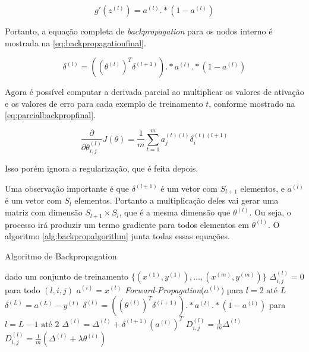 \begin{equation}\label{eq:funcaogprime}
g'(z^{(l)}) = a^{(l)} .* (1 - a^{(l)}) 
\end{equation}

Portanto, a equação completa de \textit{backpropagation} para os nodos interno é mostrada na \autoref{eq:backpropagationfinal}.

\begin{equation}\label{eq:backpropagationfinal}
\delta^{(l)} = ((\theta^{(l)})^T \delta^{(l+1)}) .* a^{(l)} .* (1 - a^{(l)}) 
\end{equation}

Agora é possível computar a derivada parcial ao multiplicar os valores de ativação e os valores de erro para cada exemplo de treinamento $t$, conforme mostrado na \autoref{eq:parcialbackpropfinal}.

\begin{equation}\label{eq:parcialbackpropfinal}
\frac{\partial}{\partial\theta_{i,j}^{(l)}} J(\theta) = \frac{1}{m} \sum\limits_{t=1}^{m} a_j^{(t)(l)} \delta_i^{(t)(l+1)}
\end{equation}

Isso porém ignora a regularização, que é feita depois.

Uma observação importante é que $\delta^{(l+1)}$ é um vetor com $S_{l+1}$ elementos, e $a^{(l)}$ é um vetor com $S_l$ elementos. Portanto a multiplicação deles vai gerar uma matriz com dimensão $S_{l+1} \times S_l$, que é a mesma dimensão que $\theta^{(l)}$. Ou seja, o processo irá produzir um termo gradiente para todos elementos em $\theta^{(l)}$. O algoritmo \autoref{alg:backpropalgorithm} junta todas essas equações.

\begin{algorithm} \label{alg:backpropalgorithm}
\caption{Algoritmo de Backpropagation} 
\begin{algorithmic}
	\State dado um conjunto de treinamento $\{(x^{(1)}, y^{(1)}), \ldots, (x^{(m)}, y^{(m)}) \}$
	\State $\Delta_{i,j}^{(l)} = 0$ para todo $(l, i, j)$
		\State $a^{(i)} = x^{(t)}$
		\State \textit{Forward-Propagation}($a^{(l)}$) para $l = 2 \text{ até } L$
		\State $\delta^{(L)} = a^{(L)} - y^{(t)}$
		\State $\delta^{(l)} = ((\theta^{(l)})^T \delta^{(l+1)}) .* a^{(l)} .* (1 - a^{(l)})$ para $l = L-1 \text{ até } 2$
		\State $\Delta^{(l)} = \Delta^{(l)} + \delta^{(l+1)}(a^{(l)})^T $ 
	\EndFor
			\State $D_{i,j}^{(l)} = \frac{1}{m}\Delta^{(l)}$
		\Else
			\State $D_{i,j}^{(l)} = \frac{1}{m}(\Delta^{(l)} + \lambda\theta^{(l)})$
		\EndIf
\EndProcedure
\end{algorithmic}
\end{algorithm}

